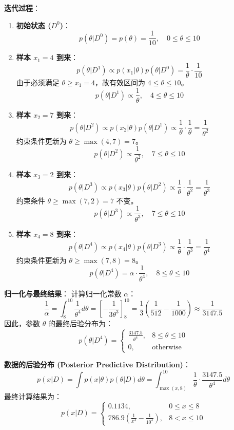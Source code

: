 \documentclass[a4paper, 11pt]{ctexart}
\begin{document}
\textbf{迭代过程}：
\begin{enumerate}
    \item \textbf{初始状态 ($D^0$)}：
    $$ p(\theta|D^0) = p(\theta) = \frac{1}{10}, \quad 0 \le \theta \le 10 $$
    
    \item \textbf{样本 $x_1 = 4$ 到来}：
    $$ p(\theta|D^1) \propto p(x_1|\theta) p(\theta|D^0) = \frac{1}{\theta} \cdot \frac{1}{10} $$
    由于必须满足 $\theta \ge x_1=4$，故有效区间为 $4 \le \theta \le 10$。
    $$ p(\theta|D^1) \propto \frac{1}{\theta}, \quad 4 \le \theta \le 10 $$

    \item \textbf{样本 $x_2 = 7$ 到来}：
    $$ p(\theta|D^2) \propto p(x_2|\theta) p(\theta|D^1) \propto \frac{1}{\theta} \cdot \frac{1}{\theta} = \frac{1}{\theta^2} $$
    约束条件更新为 $\theta \ge \max(4, 7) = 7$。
    $$ p(\theta|D^2) \propto \frac{1}{\theta^2}, \quad 7 \le \theta \le 10 $$

    \item \textbf{样本 $x_3 = 2$ 到来}：
    $$ p(\theta|D^3) \propto p(x_3|\theta) p(\theta|D^2) \propto \frac{1}{\theta} \cdot \frac{1}{\theta^2} = \frac{1}{\theta^3} $$
    约束条件 $\theta \ge \max(7, 2) = 7$ 不变。
    $$ p(\theta|D^3) \propto \frac{1}{\theta^3}, \quad 7 \le \theta \le 10 $$

    \item \textbf{样本 $x_4 = 8$ 到来}：
    $$ p(\theta|D^4) \propto p(x_4|\theta) p(\theta|D^3) \propto \frac{1}{\theta} \cdot \frac{1}{\theta^3} = \frac{1}{\theta^4} $$
    约束条件更新为 $\theta \ge \max(7, 8) = 8$。
    $$ p(\theta|D^4) = \alpha \cdot \frac{1}{\theta^4}, \quad 8 \le \theta \le 10 $$
\end{enumerate}

\textbf{归一化与最终结果}：
计算归一化常数 $\alpha$：
$$ \frac{1}{\alpha} = \int_8^{10} \frac{1}{\theta^4} d\theta = \left[ -\frac{1}{3\theta^3} \right]_8^{10} = \frac{1}{3} \left( \frac{1}{512} - \frac{1}{1000} \right) \approx \frac{1}{3147.5} $$
因此，参数 $\theta$ 的最终后验分布为：
\begin{equation}
    p(\theta|D^4) = \begin{cases} 
    \frac{3147.5}{\theta^4}, & 8 \le \theta \le 10 \\
    0, & \text{otherwise}
    \end{cases}
\end{equation}

\textbf{数据的后验分布 (Posterior Predictive Distribution)}：
$$ p(x|D) = \int p(x|\theta) p(\theta|D) d\theta = \int_{\max(x, 8)}^{10} \frac{1}{\theta} \cdot \frac{3147.5}{\theta^4} d\theta $$
最终计算结果为：
\begin{equation}
    p(x|D) = \begin{cases} 
    0.1134, & 0 \le x \le 8 \\
    786.9 (\frac{1}{x^4} - \frac{1}{10^4}), & 8 < x \le 10
    \end{cases}
\end{equation}
\end{document}
